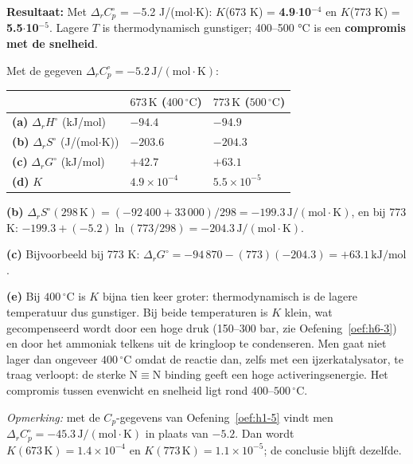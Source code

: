 \begin{oplossing}
\textbf{Resultaat:} Met \(\Delta_r C_p^\circ\) = \ensuremath{-}5.2 J/(mol\ensuremath{\cdot{}}K): \(K\)(673 K) = \textbf{4.9\ensuremath{\cdot{}}10\ensuremath{^{-4}}} en \(K\)(773 K) = \textbf{5.5\ensuremath{\cdot{}}10\ensuremath{^{-5}}}. Lagere \(T\) is thermodynamisch gunstiger; 400--500 °C is een \textbf{compromis met de snelheid}.

Met de gegeven \(\Delta_r C_p^\circ = -5.2\,\mathrm{J/(mol\cdot K)}\):

\begin{center}
\begin{tabular}{lll}
\toprule
 & \(673\,\mathrm{K}\) (\(400\,^\circ\mathrm{C}\)) & \(773\,\mathrm{K}\) (\(500\,^\circ\mathrm{C}\)) \\
\midrule
\textbf{(a)} \(\Delta_r H^\circ\) (kJ/mol) & \(-94.4\) & \(-94.9\) \\
\textbf{(b)} \(\Delta_r S^\circ\) (J/(mol\ensuremath{\cdot{}}K)) & \(-203.6\) & \(-204.3\) \\
\textbf{(c)} \(\Delta_r G^\circ\) (kJ/mol) & \(+42.7\) & \(+63.1\) \\
\textbf{(d)} \(K\) & \(4.9\times10^{-4}\) & \(5.5\times10^{-5}\) \\
\bottomrule
\end{tabular}
\end{center}

\textbf{(b)} \(\Delta_r S^\circ(298\,\mathrm{K}) = (-92\,400 + 33\,000)/298 = -199.3\,\mathrm{J/(mol\cdot K)}\), en bij 773 K: \(-199.3 + (-5.2)\ln(773/298) = -204.3\,\mathrm{J/(mol\cdot K)}\).

\textbf{(c)} Bijvoorbeeld bij 773 K: \(\Delta_r G^\circ = -94\,870 - (773)(-204.3) = +63.1\,\mathrm{kJ/mol}\).

\textbf{(e)} Bij \(400\,^\circ\mathrm{C}\) is \(K\) bijna tien keer groter: thermodynamisch is de lagere temperatuur dus gunstiger. Bij beide temperaturen is \(K\) klein, wat gecompenseerd wordt door een hoge druk (150--300 bar, zie Oefening~\ref{oef:h6-3}) en door het ammoniak telkens uit de kringloop te condenseren. Men gaat niet lager dan ongeveer \(400\,^\circ\mathrm{C}\) omdat de reactie dan, zelfs met een ijzerkatalysator, te traag verloopt: de sterke \(\mathrm{N{\equiv}N}\) binding geeft een hoge activeringsenergie. Het compromis tussen evenwicht en snelheid ligt rond \(400\)--\(500\,^\circ\mathrm{C}\).

\emph{Opmerking:} met de \(C_p\)-gegevens van Oefening~\ref{oef:h1-5} vindt men \(\Delta_r C_p^\circ = -45.3\,\mathrm{J/(mol\cdot K)}\) in plaats van \(-5.2\). Dan wordt \(K(673\,\mathrm{K}) = 1.4\times10^{-4}\) en \(K(773\,\mathrm{K}) = 1.1\times10^{-5}\); de conclusie blijft dezelfde.
\end{oplossing}

